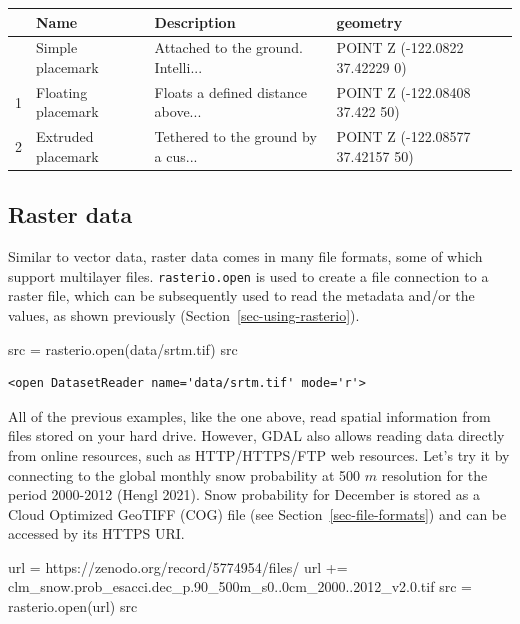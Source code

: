 \documentclass[
  letterpaper,
]{krantz}
\newenvironment{Shaded}{\begin{snugshade}}{\end{snugshade}}
\newcommand{\BuiltInTok}[1]{\textcolor[rgb]{0.00,0.23,0.31}{#1}}
\newcommand{\NormalTok}[1]{\textcolor[rgb]{0.00,0.23,0.31}{#1}}
\newcommand{\OperatorTok}[1]{\textcolor[rgb]{0.37,0.37,0.37}{#1}}
\newcommand{\StringTok}[1]{\textcolor[rgb]{0.13,0.47,0.30}{#1}}
\begin{document}
\begin{longtable}[]{@{}llll@{}}
\toprule\noalign{}
& Name & Description & geometry \\
\midrule\noalign{}
\endhead
\bottomrule\noalign{}
\endlastfoot
0 & Simple placemark & Attached to the ground. Intelli... & POINT Z
(-122.0822 37.42229 0) \\
1 & Floating placemark & Floats a defined distance above... & POINT Z
(-122.08408 37.422 50) \\
2 & Extruded placemark & Tethered to the ground by a cus... & POINT Z
(-122.08577 37.42157 50) \\
\end{longtable}

\subsection{Raster data}\label{sec-input-raster}

Similar to vector data, raster data comes in many file formats, some of
which support multilayer files. \texttt{rasterio.open} is used to create
a file connection to a raster file, which can be subsequently used to
read the metadata and/or the values, as shown previously
(Section~\ref{sec-using-rasterio}).

\begin{Shaded}
\begin{Highlighting}[]
\NormalTok{src }\OperatorTok{=}\NormalTok{ rasterio.}\BuiltInTok{open}\NormalTok{(}\StringTok{\textquotesingle{}data/srtm.tif\textquotesingle{}}\NormalTok{)}
\NormalTok{src}
\end{Highlighting}
\end{Shaded}

\begin{verbatim}
<open DatasetReader name='data/srtm.tif' mode='r'>
\end{verbatim}

All of the previous examples, like the one above, read spatial
information from files stored on your hard drive. However, GDAL also
allows reading data directly from online resources, such as
HTTP/HTTPS/FTP web resources. Let's try it by connecting to the global
monthly snow probability at 500 \(m\) resolution for the period
2000-2012 (Hengl 2021). Snow probability for December is stored as a
Cloud Optimized GeoTIFF (COG) file (see Section~\ref{sec-file-formats})
and can be accessed by its HTTPS URI.

\begin{Shaded}
\begin{Highlighting}[]
\NormalTok{url }\OperatorTok{=} \StringTok{\textquotesingle{}https://zenodo.org/record/5774954/files/\textquotesingle{}}
\NormalTok{url }\OperatorTok{+=} \StringTok{\textquotesingle{}clm\_snow.prob\_esacci.dec\_p.90\_500m\_s0..0cm\_2000..2012\_v2.0.tif\textquotesingle{}}
\NormalTok{src }\OperatorTok{=}\NormalTok{ rasterio.}\BuiltInTok{open}\NormalTok{(url)}
\NormalTok{src}
\end{Highlighting}
\end{Shaded}
\end{document}
